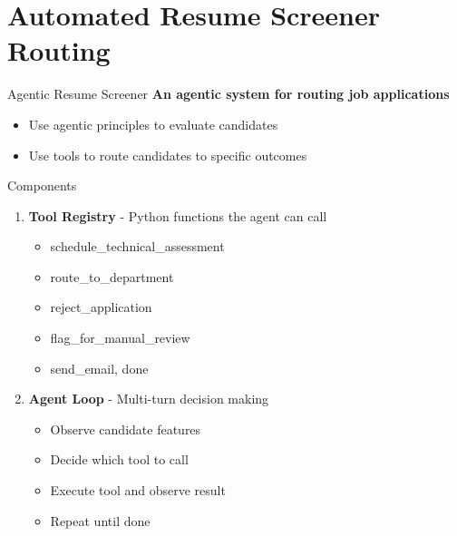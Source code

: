 \documentclass[aspectratio=169]{beamer}
\begin{document}
\section{Automated Resume Screener Routing}

\begin{frame}{Agentic Resume Screener}
\textbf{An agentic system for routing job applications}
\begin{itemize}
	\item Use agentic principles to evaluate candidates
	\item Use tools to route candidates to specific outcomes
\end{itemize}
\vspace{0.3cm}

\end{frame}

\begin{frame}{Components}

\begin{enumerate}
    \item \textbf{Tool Registry} - Python functions the agent can call
    \begin{itemize}
        \item schedule\_technical\_assessment
        \item route\_to\_department
        \item reject\_application
        \item flag\_for\_manual\_review
        \item send\_email, done
    \end{itemize}
    \vspace{0.2cm}

    \item \textbf{Agent Loop} - Multi-turn decision making
    \begin{itemize}
        \item Observe candidate features
        \item Decide which tool to call
        \item Execute tool and observe result
        \item Repeat until done
    \end{itemize}
\end{enumerate}
\end{frame}
\end{document}
